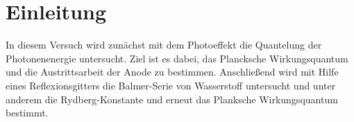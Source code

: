 \section{Einleitung}
In diesem Versuch wird zunächst mit dem Photoeffekt die Quantelung der Photonenenergie untersucht. Ziel ist es dabei, das Plancksche Wirkungsquantum und die Austrittsarbeit der Anode zu bestimmen. Anschließend wird mit Hilfe eines Reflexionsgitters die Balmer-Serie von Wasserstoff untersucht und unter anderem die Rydberg-Konstante und erneut das Planksche Wirkungsquantum bestimmt. 